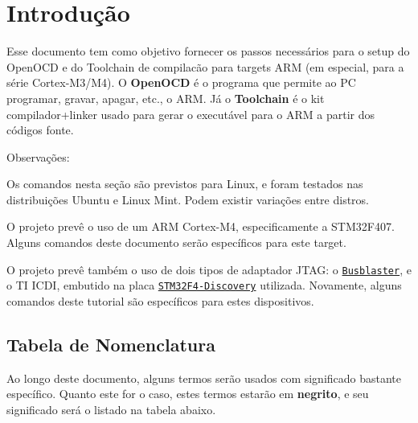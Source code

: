 \hypertarget{page_setup_page_setup_sec_introduction}{}\section{Introdução}\label{page_setup_page_setup_sec_introduction}
Esse documento tem como objetivo fornecer os passos necessários para o setup do Open\-O\-C\-D e do Toolchain de compilacão para targets A\-R\-M (em especial, para a série Cortex-\/\-M3/\-M4). O {\bfseries Open\-O\-C\-D} é o programa que permite ao P\-C programar, gravar, apagar, etc., o A\-R\-M. Já o {\bfseries Toolchain} é o kit compilador+linker usado para gerar o executável para o A\-R\-M a partir dos códigos fonte.

Observações\-:
\begin{DoxyItemize}
\item Os comandos nesta seção são previstos para Linux, e foram testados nas distribuições Ubuntu e Linux Mint. Podem existir variações entre distros.
\item O projeto prevê o uso de um A\-R\-M Cortex-\/\-M4, especificamente a S\-T\-M32\-F407. Alguns comandos deste documento serão específicos para este target.
\item O projeto prevê também o uso de dois tipos de adaptador J\-T\-A\-G\-: o \href{http://dangerousprototypes.com/docs/Bus_Blaster}{\tt Busblaster}, e o T\-I I\-C\-D\-I, embutido na placa \href{http://www.st.com/stm32f4-discovery}{\tt S\-T\-M32\-F4-\/\-Discovery} utilizada. Novamente, alguns comandos deste tutorial são específicos para estes dispositivos.
\end{DoxyItemize}\hypertarget{page_setup_page_setup_sec_introduction_subsec_ton}{}\subsection{Tabela de Nomenclatura}\label{page_setup_page_setup_sec_introduction_subsec_ton}
Ao longo deste documento, alguns termos serão usados com significado bastante específico. Quanto este for o caso, estes termos estarão em {\bfseries negrito}, e seu significado será o listado na tabela abaixo.

